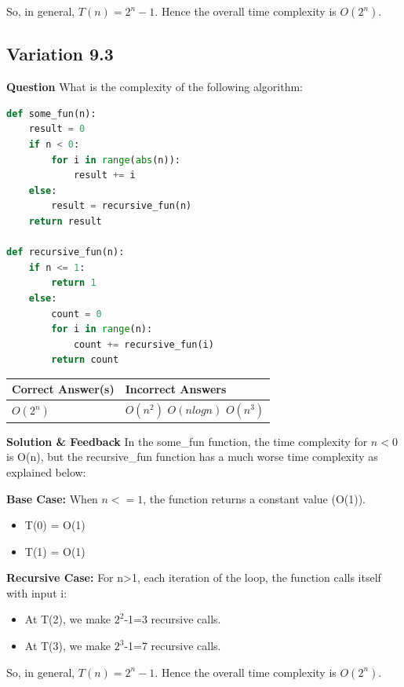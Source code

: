 So, in general, $T(n)=2^n-1$. Hence the overall time complexity is $O(2^n)$.

\subsection{Variation 9.3}
\textbf{Question}
What is the complexity of the following algorithm:

\begin{lstlisting}[language=Python]
def some_fun(n):
    result = 0
    if n < 0:
        for i in range(abs(n)):
            result += i
    else:
        result = recursive_fun(n)
    return result

def recursive_fun(n):
    if n <= 1:
        return 1
    else:
        count = 0
        for i in range(n):
            count += recursive_fun(i)
        return count
\end{lstlisting}

\begin{center}
\begin{tabular}{|l|l|}
\hline
\textbf{Correct Answer(s)} & \textbf{Incorrect Answers} \\
\hline
$O(2^n)$ & $O(n^2)$ $O(nlogn)$ $O(n^3)$ \\
\hline
\end{tabular}
\end{center}

\textbf{Solution \& Feedback}
In the some\_fun function, the time complexity for $n<0$ is O(n), but the recursive\_fun function has a much worse time complexity as explained below:

\textbf{Base Case:} When $n<=1$, the function returns a constant value (O(1)).
\begin{itemize}
\item T(0) = O(1)
\item T(1) = O(1)
\end{itemize}

\textbf{Recursive Case:} For n>1, each iteration of the loop, the function calls itself with input i:
\begin{itemize}
\item At T(2), we make $2^2$-1=3 recursive calls.
\item At T(3), we make $2^3$-1=7 recursive calls.
\end{itemize}

So, in general, \(T(n)=2^n-1\). Hence the overall time complexity is $O(2^n)$.

